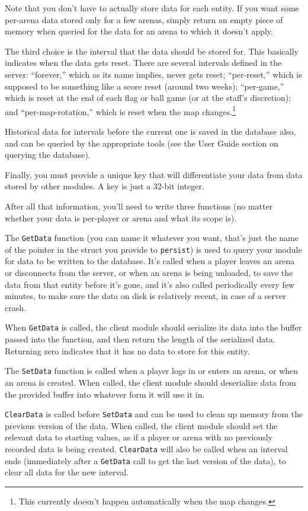 \documentclass{article}
\begin{document}
Note that you don't have to actually store data for each entity. If you
want some per-arena data stored only for a few arenas, simply return an
empty piece of memory when queried for the data for an arena to which it
doesn't apply.

The third choice is the interval that the data should be stored for.
This basically indicates when the data gets reset. There are several
intervals defined in the server: ``forever,'' which as its name implies,
never gets reset; ``per-reset,'' which is supposed to be something like
a score reset (around two weeks); ``per-game,'' which is reset at the
end of each flag or ball game (or at the staff's discretion); and
``per-map-rotation,'' which is reset when the map changes.\footnote{This
currently doesn't happen automatically when the map changes.}

Historical data for intervals before the current one is saved in the
database also, and can be queried by the appropriate tools (see the User
Guide section on querying the database).

Finally, you must provide a unique key that will differentiate your data
from data stored by other modules. A key is just a 32-bit integer.

After all that information, you'll need to write three functions (no
matter whether your data is per-player or arena and what its scope is).

The \verb/GetData/ function (you can name it whatever you want, that's
just the name of the pointer in the struct you provide to
\verb/persist/) is used to query your module for data to be written to
the database. It's called when a player leaves an arena or disconnects
from the server, or when an arena is being unloaded, to save the data
from that entity before it's gone, and it's also called periodically
every few minutes, to make sure the data on disk is relatively recent,
in case of a server crash.

When \verb/GetData/ is called, the client module should serialize its
data into the buffer passed into the function, and then return the
length of the serialized data. Returning zero indicates that it has no
data to store for this entity.

The \verb/SetData/ function is called when a player logs in or enters an
arena, or when an arena is created. When called, the client module
should deserialize data from the provided buffer into whatever form it
will use it in.

\verb/ClearData/ is called before \verb/SetData/ and can be used to
clean up memory from the previous version of the data. When called, the
client module should set the relevant data to starting values, as if a
player or arena with no previously recorded data is being created.
\verb/ClearData/ will also be called when an interval ends (immediately
after a \verb/GetData/ call to get the last version of the data), to
clear all data for the new interval.
\end{document}
